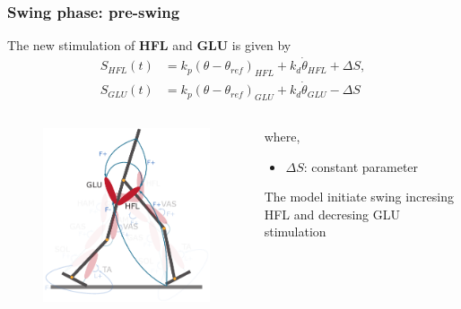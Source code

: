 \documentclass[10pt]{beamer}
\begin{document}
	\begin{frame}
		\frametitle{Swing phase: pre-swing}
		\begin{block}{}
			The new stimulation of \textbf{HFL} and \textbf{GLU} is given by
			\begin{align*}
				S_{HFL}(t)&=  k_p (\theta-\theta_{ref})_{HFL} + k_d \dot{\theta}_{HFL} + \Delta S,  \\
				S_{GLU}(t)&=  k_p (\theta-\theta_{ref})_{GLU} + k_d \dot{\theta}_{GLU} - \Delta S
			\end{align*}
		\end{block}
		
		\begin{columns}
			\begin{column}{.5\textwidth}
				\begin{figure}
					\centering
					\includegraphics[width=.5\textheight]{images/new_model/swing/muscle_pre_glu.pdf}
				\end{figure}
			\end{column}
			\begin{column}{.5\textwidth}
				where,
				\begin{itemize}
					\item $\Delta S$: constant parameter
				\end{itemize}
				\begin{exampleblock}{}
					The model initiate swing incresing HFL and decresing GLU stimulation
				\end{exampleblock}		
			\end{column}
		\end{columns}	
	\end{frame}
	
\end{document}
